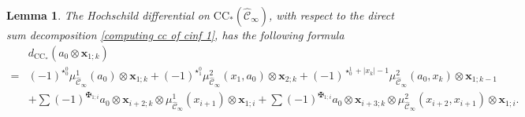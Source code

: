 \documentclass[11pt]{amsproc}
\def\cc{\mathcal{C}}
\def\r#1{\mathrm{#1}}
\def\cinf{\widehat{\cc}_{\infty}}
\newtheorem{lem}{Lemma}[section]
\theoremstyle{remark}
\numberwithin{equation}{section}
\begin{document}
\begin{lem}\label{lem: hochschild differential on cinf decreases length only by one}
The Hochschild differential on $\r{CC}_{*}(\cinf)$,
with respect to the direct sum decomposition \eqref{computing cc of cinf 1},
has the following formula
\begin{equation}\label{hochschild chain differential on cinf}
\begin{split}
& d_{\r{CC}_{*}}(a_{0} \otimes \mathbf{x}_{1;k}) \\
=  & (-1)^{\star_{0}^{0}} \mu_{\cinf}^{1}(a_{0}) \otimes \mathbf{x}_{1;k} + (-1)^{\star_{1}^{0}} \mu_{\cinf}^{2}(x_{1}, a_{0}) \otimes \mathbf{x}_{2; k}
 + (-1)^{\star_{0}^{1} + |x_{k}|-1} \mu_{\cinf}^{2}(a_{0}, x_{k}) \otimes \mathbf{x}_{1;k-1} \\
& + \sum (-1)^{\maltese_{1;i}} a_{0} \otimes \mathbf{x}_{i+2; k} \otimes \mu_{\cinf}^{1}(x_{i+1}) \otimes \mathbf{x}_{1;i} 
+ \sum (-1)^{\maltese_{1;i}} a_{0} \otimes \mathbf{x}_{i+3; k} \otimes \mu_{\cinf}^{2}(x_{i+2}, x_{i+1}) \otimes \mathbf{x}_{1;i}.
\end{split}
\end{equation}
\end{lem}
\end{document}
